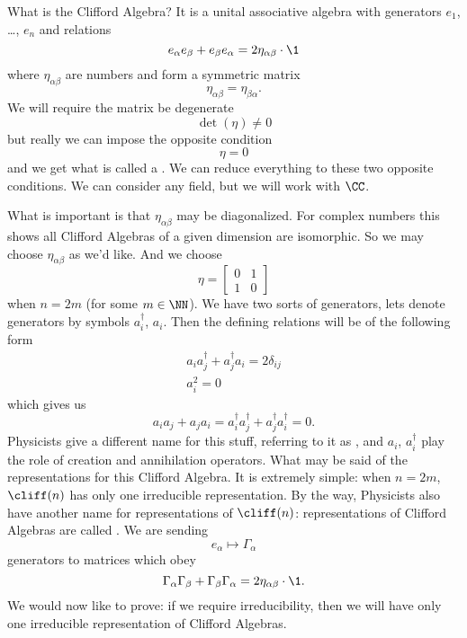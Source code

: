 What is the Clifford Algebra? It is a unital associative algebra
with generators $e_{1}$, \dots, $e_{n}$ and relations
\begin{equation}
e_{\alpha}e_{\beta}+e_{\beta}e_{\alpha}=2\eta_{\alpha\beta}\cdot\1
\end{equation}
where $\eta_{\alpha\beta}$ are numbers and form a symmetric
matrix
\begin{equation}
\eta_{\alpha\beta}=\eta_{\beta\alpha}.
\end{equation}
We will require the matrix be degenerate
\begin{equation}
\det(\eta)\not=0
\end{equation}
but really we can impose the opposite condition
\begin{equation}
\eta=0
\end{equation}
and we get what is called a . We can
reduce everything to these two opposite conditions. We can
consider any field, but we will work with $\CC$.

What is important is that $\eta_{\alpha\beta}$ may be
diagonalized. For complex numbers this shows all Clifford
Algebras of a given dimension are isomorphic. So we may choose
$\eta_{\alpha\beta}$ as we'd like. And we choose
\begin{equation}
\eta = \begin{bmatrix} 0 & 1\\
1 & 0
\end{bmatrix}
\end{equation}
when $n=2m$ (for some $m\in\NN$). We have two sorts of
generators, lets denote generators by symbols $a^{\dagger}_{i}$,
$a_{i}$. Then the defining relations will be of the following
form
\begin{subequations}
\begin{align}
a_{i}a_{j}^{\dagger}+a_{j}^{\dagger}a_{i}=2\delta_{ij}\\
a_{i}^{2}=0
\end{align}
\end{subequations}
which gives us
\begin{equation}
a_{i}a_{j}+a_{j}a_{i}=a_{i}^{\dagger}a_{j}^{\dagger}+a_{j}^{\dagger}a_{i}^{\dagger}=0.
\end{equation}
Physicists give a different name for this stuff, referring to it
as , and $a_{i}$,
$a_{i}^{\dagger}$ play the role of creation and annihilation
operators. What may be said of the representations for this
Clifford Algebra. It is extremely simple: when $n=2m$, $\cliff(n)$
has only one irreducible representation. By the way, Physicists
also have another name for representations of $\cliff(n)$:
representations of Clifford Algebras are called . We are sending
\begin{equation}
e_{\alpha}\mapsto\Gamma_{\alpha}
\end{equation}
generators to matrices which obey
\begin{equation}
\Gamma_{\alpha}\Gamma_{\beta}+\Gamma_{\beta}\Gamma_{\alpha}=2\eta_{\alpha\beta}\cdot\1.
\end{equation}
We would now like to prove: if we require irreducibility, then we
will have only one irreducible representation of Clifford
Algebras.


